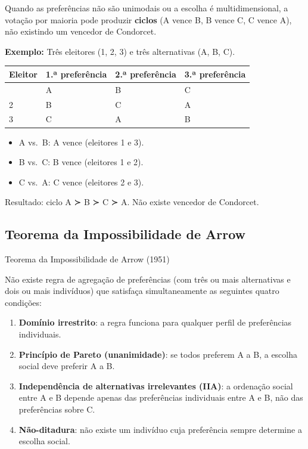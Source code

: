 \documentclass[11pt,twoside,openright]{book}
\providecommand{\tightlist}{\setlength{\itemsep}{0pt}\setlength{\parskip}{0pt}}
\begin{document}
Quando as preferências não são unimodais ou a escolha é
multidimensional, a votação por maioria pode produzir \textbf{ciclos} (A
vence B, B vence C, C vence A), não existindo um vencedor de Condorcet.

\textbf{Exemplo:} Três eleitores (1, 2, 3) e três alternativas (A, B,
C).

{\def\LTcaptype{none} %
\begin{longtable}[]{@{}llll@{}}
\toprule\noalign{}
Eleitor & 1.ª preferência & 2.ª preferência & 3.ª preferência \\
\midrule\noalign{}
\endhead
\bottomrule\noalign{}
\endlastfoot
1 & A & B & C \\
2 & B & C & A \\
3 & C & A & B \\
\end{longtable}
}

\begin{itemize}
\tightlist
\item
  A vs.~B: A vence (eleitores 1 e 3).
\item
  B vs.~C: B vence (eleitores 1 e 2).
\item
  C vs.~A: C vence (eleitores 2 e 3).
\end{itemize}

Resultado: ciclo A ≻ B ≻ C ≻ A. Não existe vencedor de Condorcet.

\subsection{Teorema da Impossibilidade de
Arrow}\label{teorema-da-impossibilidade-de-arrow}

\begin{theorembox}{Teorema da Impossibilidade de Arrow (1951)}

Não existe regra de agregação de preferências (com três ou mais
alternativas e dois ou mais indivíduos) que satisfaça simultaneamente as
seguintes quatro condições:

\begin{enumerate}
\def\labelenumi{\arabic{enumi}.}
\tightlist
\item
  \textbf{Domínio irrestrito}: a regra funciona para qualquer perfil de
  preferências individuais.
\item
  \textbf{Princípio de Pareto (unanimidade)}: se todos preferem A a B, a
  escolha social deve preferir A a B.
\item
  \textbf{Independência de alternativas irrelevantes (IIA)}: a ordenação
  social entre A e B depende apenas das preferências individuais entre A
  e B, não das preferências sobre C.
\item
  \textbf{Não-ditadura}: não existe um indivíduo cuja preferência sempre
  determine a escolha social.
\end{enumerate}

\end{theorembox}
\end{document}
